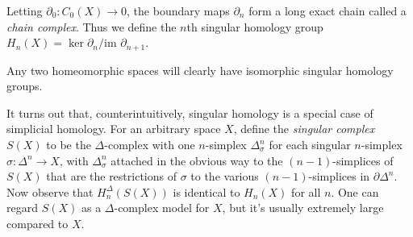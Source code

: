 \documentclass[a4paper]{article}
\begin{document}
Letting $\partial_0 : C_0(X) \to 0$, the boundary maps $\partial_n$ form a long exact chain called a \emph{chain complex}. Thus we define the $n$th singular homology group $H_n(X) = \ker \partial_n / \text{im } \partial_{n+1}$.

Any two homeomorphic spaces will clearly have isomorphic singular homology groups.

It turns out that, counterintuitively, singular homology is a special case of simplicial homology. For an arbitrary space $X$, define the \emph{singular complex} $S(X)$ to be the $\Delta$-complex with one $n$-simplex $\Delta_\sigma^n$ for each singular $n$-simplex $\sigma : \Delta^n \to X$, with $\Delta_\sigma^n$ attached in the obvious way to the $(n-1)$-simplices of $S(X)$ that are the restrictions of $\sigma$ to the various $(n-1)$-simplices in $\partial \Delta^n$. Now observe that $H_n^\Delta(S(X))$ is identical to $H_n(X)$ for all $n$. One can regard $S(X)$ as a $\Delta$-complex model for $X$, but it's usually extremely large compared to $X$.
\end{document}
